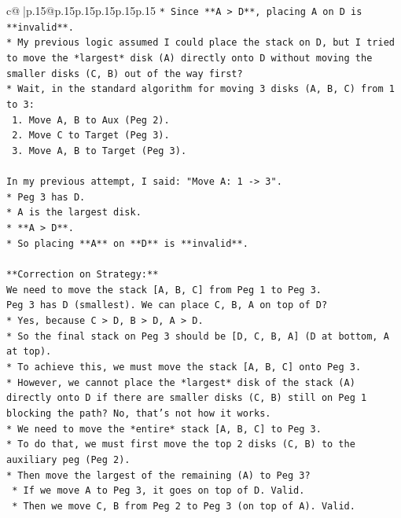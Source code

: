 \documentclass{article}
\begin{document}
{\begin{supertabular}{c@{$\;$}|p{.15\linewidth}@{}p{.15\linewidth}p{.15\linewidth}p{.15\linewidth}p{.15\linewidth}p{.15\linewidth}}
{{{\texttt{*   Since **A > D**, placing A on D is **invalid**.} \\
\texttt{*   My previous logic assumed I could place the stack on D, but I tried to move the *largest* disk (A) directly onto D without moving the smaller disks (C, B) out of the way first?} \\
\texttt{*   Wait, in the standard algorithm for moving 3 disks (A, B, C) from 1 to 3:} \\
\texttt{    1. Move A, B to Aux (Peg 2).} \\
\texttt{    2. Move C to Target (Peg 3).} \\
\texttt{    3. Move A, B to Target (Peg 3).} \\
\\ 
\texttt{In my previous attempt, I said: "Move A: 1 {-}> 3".} \\
\texttt{*   Peg 3 has D.} \\
\texttt{*   A is the largest disk.} \\
\texttt{*   **A > D**.} \\
\texttt{*   So placing **A** on **D** is **invalid**.} \\
\\ 
\texttt{**Correction on Strategy:**} \\
\texttt{We need to move the stack {[}A, B, C{]} from Peg 1 to Peg 3.} \\
\texttt{Peg 3 has D (smallest). We can place C, B, A on top of D?} \\
\texttt{*   Yes, because C > D, B > D, A > D.} \\
\texttt{*   So the final stack on Peg 3 should be {[}D, C, B, A{]} (D at bottom, A at top).} \\
\texttt{*   To achieve this, we must move the stack {[}A, B, C{]} onto Peg 3.} \\
\texttt{*   However, we cannot place the *largest* disk of the stack (A) directly onto D if there are smaller disks (C, B) still on Peg 1 blocking the path? No, that's not how it works.} \\
\texttt{*   We need to move the *entire* stack {[}A, B, C{]} to Peg 3.} \\
\texttt{*   To do that, we must first move the top 2 disks (C, B) to the auxiliary peg (Peg 2).} \\
\texttt{*   Then move the largest of the remaining (A) to Peg 3?} \\
\texttt{    *   If we move A to Peg 3, it goes on top of D. Valid.} \\
\texttt{    *   Then we move C, B from Peg 2 to Peg 3 (on top of A). Valid.} \\
}}}
\end{supertabular}}
\end{document}
